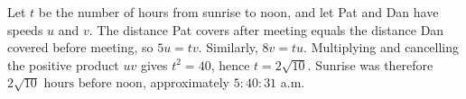 Let $t$ be the number of hours from sunrise to noon, and let Pat and Dan have speeds $u$ and $v$. The distance Pat covers after meeting equals the distance Dan covered before meeting, so $5u=tv$. Similarly, $8v=tu$. Multiplying and cancelling the positive product $uv$ gives $t^2=40$, hence $t=2\sqrt{10}$. Sunrise was therefore $\boxed{2\sqrt{10}\text{ hours before noon}}$, approximately $5{:}40{:}31$ a.m.
